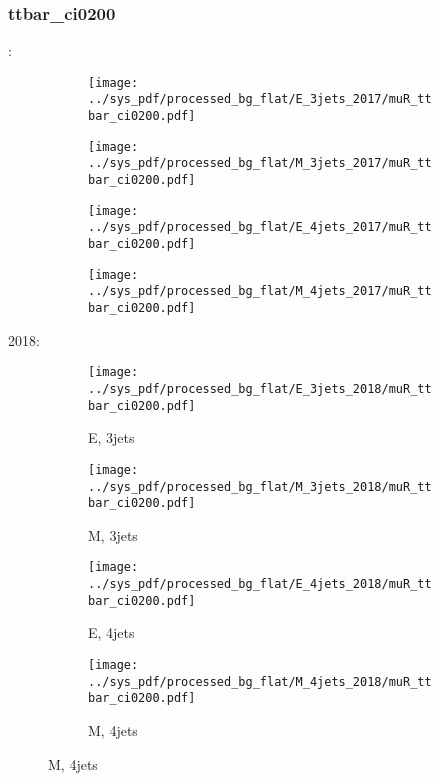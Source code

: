 \documentclass{beamer}
\begin{document}
\begin{frame}
\frametitle{ttbar_ci0200}
\fontsize{5}{1}:
\begin{figure}
\centering
\begin{subfigure}[b]{0.24\textwidth}
\texttt{[image: ../sys\_pdf/processed\_bg\_flat/E\_3jets\_2017/muR\_ttbar\_ci0200.pdf]}
\end{subfigure}
\begin{subfigure}[b]{0.24\textwidth}
\texttt{[image: ../sys\_pdf/processed\_bg\_flat/M\_3jets\_2017/muR\_ttbar\_ci0200.pdf]}
\end{subfigure}
\begin{subfigure}[b]{0.24\textwidth}
\texttt{[image: ../sys\_pdf/processed\_bg\_flat/E\_4jets\_2017/muR\_ttbar\_ci0200.pdf]}
\end{subfigure}
\begin{subfigure}[b]{0.24\textwidth}
\texttt{[image: ../sys\_pdf/processed\_bg\_flat/M\_4jets\_2017/muR\_ttbar\_ci0200.pdf]}
\end{subfigure}
\end{figure}
2018:
\begin{figure}
\centering
\begin{subfigure}[b]{0.24\textwidth}
\texttt{[image: ../sys\_pdf/processed\_bg\_flat/E\_3jets\_2018/muR\_ttbar\_ci0200.pdf]}
\captionsetup{font=tiny}
\caption{E, 3jets}
\end{subfigure}
\begin{subfigure}[b]{0.24\textwidth}
\texttt{[image: ../sys\_pdf/processed\_bg\_flat/M\_3jets\_2018/muR\_ttbar\_ci0200.pdf]}
\captionsetup{font=tiny}
\caption{M, 3jets}
\end{subfigure}
\begin{subfigure}[b]{0.24\textwidth}
\texttt{[image: ../sys\_pdf/processed\_bg\_flat/E\_4jets\_2018/muR\_ttbar\_ci0200.pdf]}
\captionsetup{font=tiny}
\caption{E, 4jets}
\end{subfigure}
\begin{subfigure}[b]{0.24\textwidth}
\texttt{[image: ../sys\_pdf/processed\_bg\_flat/M\_4jets\_2018/muR\_ttbar\_ci0200.pdf]}
\captionsetup{font=tiny}
\caption{M, 4jets}
\end{subfigure}
\end{figure}
\end{frame}
\end{document}
